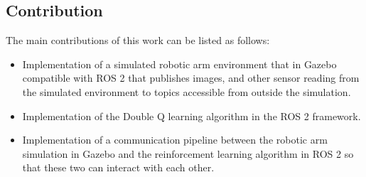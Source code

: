 \documentclass[12pt,oneside]{article}
\begin{document}
   


%
%
%
%

\subsection{Contribution}
The main contributions of this work can be listed as follows:
\begin{itemize}
    \item Implementation of a simulated robotic arm environment that in Gazebo compatible with ROS 2 that publishes images, and other sensor reading from the simulated environment to topics accessible from outside the simulation.
    \item Implementation of the Double Q learning algorithm in the ROS 2 framework.
    \item Implementation of a communication pipeline between the robotic arm simulation in Gazebo and the reinforcement learning algorithm in ROS 2 so that these two can interact with each other.
\end{itemize}
\end{document}
